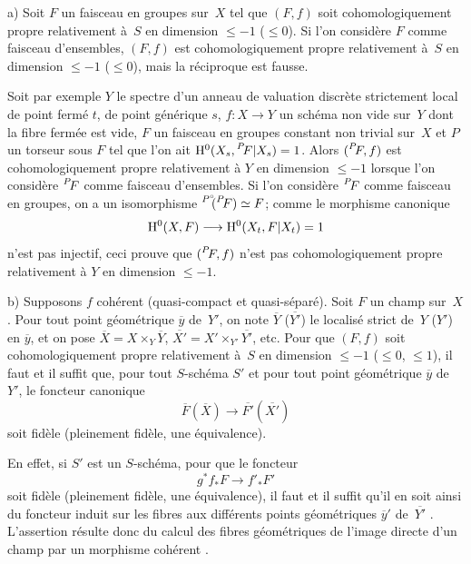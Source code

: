 \begin{remarques}
\label{XIII.1.5}
a) Soit $F$ un faisceau en groupes sur~$X$ tel que $(F,f)$ soit
cohomologiquement propre relativement \`a~$S$ en dimension
$\leqslant -1$ (\resp $\leqslant 0$). Si l'on consid\`ere $F$ comme
faisceau d'ensembles, $(F,f)$ est cohomologiquement propre
relativement \`a~$S$ en dimension $\leqslant -1$ (\resp $\leqslant
0$), mais la r\'eciproque est fausse.

Soit par exemple $Y$ le spectre d'un anneau de valuation discr\`ete
strictement local de point ferm\'e $t$, de point g\'en\'erique
$s$, $f \colon X \to Y$ un sch\'ema non vide sur~$Y$ dont la fibre
ferm\'ee est vide, $F$ un faisceau en groupes constant non trivial
sur~$X$ et $P$ un torseur sous $F$ tel que l'on ait $\H^0(X_s,
\leftexp{P\mkern-4mu}{F}|X_s)=1$. Alors $(\leftexp{P\mkern-4mu}{F},f)$ est
cohomologiquement propre relativement \`a $Y$ en dimension
$\leqslant -1$ lorsque l'on consid\`ere $\leftexp{P\mkern-4mu}{F}$ comme
faisceau d'ensembles. Si l'on consid\`ere $\leftexp{P\mkern-4mu}{F}$ comme faisceau
en groupes, on a un isomorphisme ${\vphantom{F}}^{P^\circ\mkern-7mu}(\leftexp{P\mkern-4mu}{F})
\simeq F$; comme le morphisme canonique
$$
\H^0(X,F)\to\H^0(X_t,F|X_t)=1
$$
n'est pas injectif, ceci prouve que $(\leftexp{P\mkern-4mu}{F},f)$ n'est pas
cohomologiquement propre relativement \`a $Y$ en dimension
$\leqslant -1$.


b) Supposons $f$ coh\'erent (\ie quasi-compact et
quasi-s\'epar\'e). Soit $F$ un champ sur~$X$. Pour tout point
g\'eom\'etrique $\overline{y}$ de~$Y'$, on note $\overline{Y}$
(\resp $\overline{Y'}$) le localis\'e strict de~$Y$ (\resp $Y'$) en
$\overline{y}$, et on pose $\overline{X} = X \times_Y \overline{Y}$,
$\overline{X'} = X' \times_{Y'} \overline{Y'}$, etc. Pour que $(F,f)$
soit cohomologiquement propre relativement \`a~$S$ en dimension
$\leqslant -1$ (\resp $\leqslant 0$, \resp $\leqslant 1$), il faut et
il suffit que, pour tout $S$-sch\'ema $S'$ et pour tout point
g\'eom\'etrique $\overline{y}$ de~$Y'$, le foncteur canonique
$$
\overline{F}(\overline{X})\to\overline{F'}(\overline{X'})
$$
soit fid\`ele (\resp pleinement fid\`ele, \resp une
\'equivalence).

En
effet, si $S'$ est un $S$-sch\'ema, pour que le foncteur
$$
g^* f_* F \to f'_* F'
$$
soit fid\`ele (\resp pleinement fid\`ele, \resp une
\'equivalence), il faut et il suffit qu'il en soit ainsi du foncteur
induit sur les fibres aux diff\'erents points g\'eom\'etriques
$\overline{y}'$ de~$\overline{Y'}$ \cite[III 2.1.5.9]{XIII.2}. L'assertion
r\'esulte donc du calcul des fibres g\'eom\'etriques de l'image
directe d'un champ par un morphisme coh\'erent \cite[VII 2.1.5]{XIII.2}.



\end{remarques}
